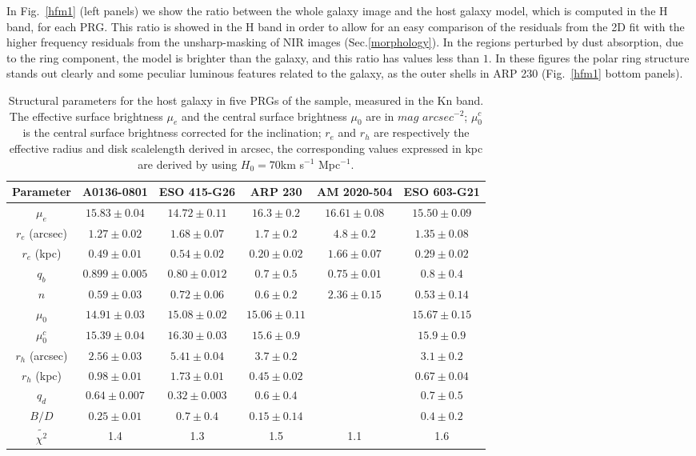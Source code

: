 \documentclass{aa}
\begin{document}
In Fig.~\ref{hfm1} (left panels) we show the ratio between the 
whole galaxy image and the host galaxy model, which is computed in the 
H band, for each PRG. This ratio is showed in the 
H band in order to allow for an easy comparison of the residuals
from the 2D fit with the higher frequency
residuals from the unsharp-masking of NIR images (Sec.\ref{morphology}). 
In the regions perturbed by dust absorption, due to the ring component, 
the model is brighter than the galaxy, and this ratio has values less than $1$. 
In these figures the polar 
ring structure stands out clearly and some peculiar luminous features 
related to the galaxy, as the outer shells in
ARP 230 (Fig.~\ref{hfm1} bottom panels).


\begin{table}[h]
\centering
\caption[]{Structural parameters for the host galaxy in five PRGs of the
sample, measured in the Kn band. 
The effective surface brightness $\mu_{e}$ and the central
surface brightness $\mu_{0}$ are in $mag$ $arcsec^{-2}$; $\mu_{0}^{c}$
is the central surface brightness corrected for the inclination; 
$r_{e}$ and $r_{h}$ are respectively
the effective radius and disk scalelength derived  in arcsec, the corresponding
values expressed in kpc are derived by using $H_{0}=70$km s$^{-1}$ Mpc$^{-1}$.}
\label{2dparam}
\begin{tabular}{cccccc}
\hline\hline
Parameter & A0136-0801 & ESO 415-G26 & ARP 230 & AM 2020-504 & ESO 603-G21\\
\hline
$\mu_{e}$ &$15.83\pm 0.04$& $14.72\pm 0.11$& $16.3\pm 0.2$& $16.61\pm 0.08$& $15.50\pm 0.09$\\
$r_{e}$ (arcsec) &$1.27\pm 0.02$& $1.68\pm 0.07$& $1.7\pm 0.2$& $4.8\pm 0.2$& $1.35\pm 0.08$\\
$r_{e}$ (kpc) &$0.49\pm 0.01$& $0.54\pm 0.02$& $0.20\pm 0.02$& $1.66\pm 0.07$& $0.29\pm 0.02$\\
$q_{b}$ &$0.899\pm 0.005$& $0.80\pm 0.012$ & $0.7\pm 0.5$& $0.75\pm 0.01$& $0.8\pm 0.4$\\
$n$ &$0.59\pm 0.03$& $0.72\pm 0.06$ & $0.6\pm 0.2$& $2.36\pm 0.15$& $0.53\pm 0.14$\\
$\mu_{0}$ &$14.91\pm 0.03$& $15.08\pm 0.02$& $15.06\pm 0.11$& & $15.67\pm 0.15$\\
$\mu_{0}^{c}$ &$15.39\pm 0.04$& $16.30\pm 0.03$ & $15.6\pm 0.9$ & & $15.9\pm 0.9$ \\
$r_{h}$ (arcsec) &$2.56\pm 0.03$& $5.41\pm 0.04$& $3.7\pm 0.2$& & $3.1\pm 0.2$ \\
$r_{h}$ (kpc) &$0.98\pm 0.01$& $1.73\pm 0.01$& $0.45\pm 0.02$& & $0.67\pm 0.04$\\
$q_{d}$ &$0.64\pm 0.007$ & $0.32\pm 0.003$ & $0.6\pm 0.4$& & $0.7\pm 0.5$ \\
$B/D$ &$0.25\pm 0.01$& $0.7\pm 0.4$ & $0.15\pm 0.14$ & &$0.4\pm 0.2$ \\
$\tilde{\chi ^2}$ &1.4& 1.3& 1.5& 1.1& 1.6\\
\hline
\end{tabular}
\end{table}
\end{document}
